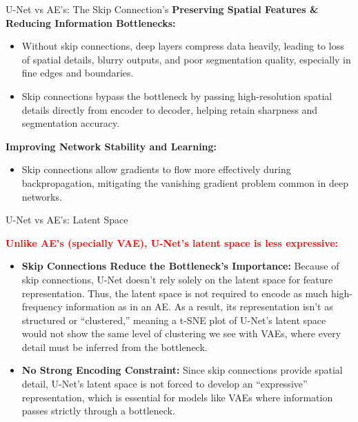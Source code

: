 \documentclass[serif, aspectratio=169]{beamer}
\begin{document}
\begin{frame}{U-Net vs AE's: The Skip Connection's}
\small
\textbf{Preserving Spatial Features \& Reducing Information Bottlenecks:}
\begin{itemize}
    \item Without skip connections, deep layers compress data heavily, leading to loss of spatial details, blurry outputs, and poor segmentation quality, especially in fine edges and boundaries.
    \item Skip connections bypass the bottleneck by passing high-resolution spatial details directly from encoder to decoder, helping retain sharpness and segmentation accuracy.
\end{itemize}

\vspace{0.5cm}

\textbf{Improving Network Stability and Learning:}
\begin{itemize}
    \item Skip connections allow gradients to flow more effectively during backpropagation, mitigating the vanishing gradient problem common in deep networks.
\end{itemize}

\end{frame}



\begin{frame}{U-Net vs AE's: Latent Space}
\small

\textcolor{red}{\textbf{Unlike AE’s (specially VAE), U-Net’s latent space is less expressive:}}

\begin{itemize}
    \item \textbf{Skip Connections Reduce the Bottleneck's Importance:} Because of skip connections, U-Net doesn’t rely solely on the latent space for feature representation. Thus, the latent space is not required to encode as much high-frequency information as in an AE. As a result, its representation isn’t as structured or “clustered,” meaning a t-SNE plot of U-Net’s latent space would not show the same level of clustering we see with VAEs, where every detail must be inferred from the bottleneck.
    
    \vspace{0.3cm}
    
    \item \textbf{No Strong Encoding Constraint:} Since skip connections provide spatial detail, U-Net’s latent space is not forced to develop an “expressive” representation, which is essential for models like VAEs where information passes strictly through a bottleneck.
\end{itemize}

\end{frame}
\end{document}
